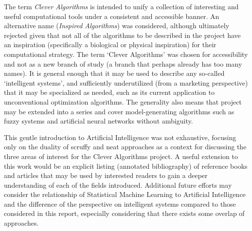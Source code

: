 The term \emph{Clever Algorithms} is intended to unify a collection of interesting and useful computational tools under a consistent and accessible banner. An alternative name (\emph{Inspired Algorithms}) was considered, although ultimately rejected given that not all of the algorithms to be described in the project have an inspiration (specifically a biological or physical inspiration) for their computational strategy. The term `Clever Algorithms' was chosen for accessibility and not as a new branch of study (a branch that perhaps already has too many names). It is general enough that it may be used to describe any so-called `intelligent systems', and sufficiently underutilized (from a marketing perspective) that it may be specialized as needed, such as its current application to unconventional optimization algorithms. The generality also means that project may be extended into a series and cover model-generating algorithms such as fuzzy systems and artificial neural networks without ambiguity.

This gentle introduction to Artificial Intelligence was not exhaustive, focusing only on the duality of scruffy and neat approaches as a context for discussing the three areas of interest for the Clever Algorithms project. A useful extension to this work would be an explicit listing (annotated bibliography) of reference books and articles that may be used by interested readers to gain a deeper understanding of each of the fields introduced. Additional future efforts may consider the relationship of Statistical Machine Learning to Artificial Intelligence and the difference of the perspective on intelligent systems compared to those considered in this report, especially considering that there exists some overlap of approaches.

% 
% 
